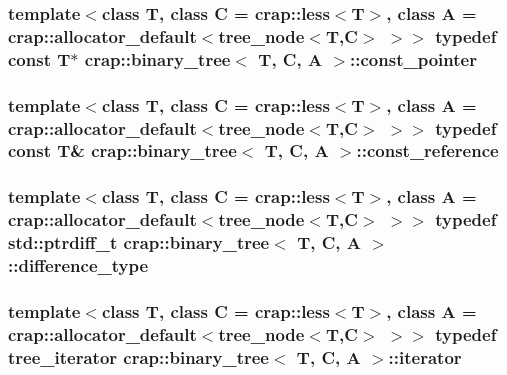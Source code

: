\hypertarget{classcrap_1_1binary__tree_a04d16c3f500fd5357170370c38526c54}{
\subsubsection[{const\-\_\-pointer}]{\setlength{\rightskip}{0pt plus 5cm}template$<$class T, class C = crap\-::less$<$\-T$>$, class A = crap\-::allocator\-\_\-default$<$tree\-\_\-node$<$\-T,\-C$>$ $>$$>$ typedef const T$\ast$ {\bf crap\-::binary\-\_\-tree}$<$ T, C, A $>$\-::{\bf const\-\_\-pointer}}}\label{classcrap_1_1binary__tree_a04d16c3f500fd5357170370c38526c54}
\hypertarget{classcrap_1_1binary__tree_a0fa18b1ab1bd0759b57e95b3804cce9a}{
\subsubsection[{const\-\_\-reference}]{\setlength{\rightskip}{0pt plus 5cm}template$<$class T, class C = crap\-::less$<$\-T$>$, class A = crap\-::allocator\-\_\-default$<$tree\-\_\-node$<$\-T,\-C$>$ $>$$>$ typedef const T\& {\bf crap\-::binary\-\_\-tree}$<$ T, C, A $>$\-::{\bf const\-\_\-reference}}}\label{classcrap_1_1binary__tree_a0fa18b1ab1bd0759b57e95b3804cce9a}
\hypertarget{classcrap_1_1binary__tree_a3c4aa7c126382d25766449ad4f9a769a}{
\subsubsection[{difference\-\_\-type}]{\setlength{\rightskip}{0pt plus 5cm}template$<$class T, class C = crap\-::less$<$\-T$>$, class A = crap\-::allocator\-\_\-default$<$tree\-\_\-node$<$\-T,\-C$>$ $>$$>$ typedef std\-::ptrdiff\-\_\-t {\bf crap\-::binary\-\_\-tree}$<$ T, C, A $>$\-::{\bf difference\-\_\-type}}}\label{classcrap_1_1binary__tree_a3c4aa7c126382d25766449ad4f9a769a}
\hypertarget{classcrap_1_1binary__tree_af3313f011a64bb5a945dcd39cc3fc3c3}{
\subsubsection[{iterator}]{\setlength{\rightskip}{0pt plus 5cm}template$<$class T, class C = crap\-::less$<$\-T$>$, class A = crap\-::allocator\-\_\-default$<$tree\-\_\-node$<$\-T,\-C$>$ $>$$>$ typedef {\bf tree\-\_\-iterator} {\bf crap\-::binary\-\_\-tree}$<$ T, C, A $>$\-::{\bf iterator}}}\label{classcrap_1_1binary__tree_af3313f011a64bb5a945dcd39cc3fc3c3}
